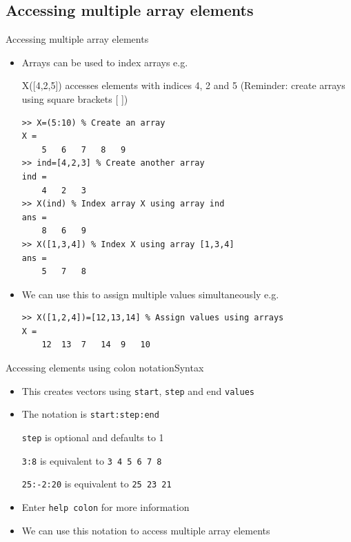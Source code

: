 \documentclass{beamer}
\begin{document}
\subsection{Accessing multiple array elements}
\begin{frame}[fragile]{Accessing multiple array elements}
	\begin{itemize}
		\item Arrays can be used to index arrays e.g.
		
		X([4,2,5]) accesses elements with indices 4, 2 and 5
		(Reminder: create arrays using square brackets [ ])
		
		\begin{lstlisting}[style=Matlab-editor,basicstyle=\scriptsize]
>> X=(5:10) % Create an array
X = 
	5	6	7	8	9
>> ind=[4,2,3] % Create another array
ind = 
	4	2	3
>> X(ind) % Index array X using array ind
ans = 
	8	6	9
>> X([1,3,4]) % Index X using array [1,3,4]
ans =
	5	7	8
		\end{lstlisting}
		\item We can use this to assign multiple values simultaneously e.g.
		
		\begin{lstlisting}[style=Matlab-editor,basicstyle=\scriptsize]
>> X([1,2,4])=[12,13,14] % Assign values using arrays
X = 
	12	13	7	14	9	10
		\end{lstlisting}
	\end{itemize}
\end{frame}

\begin{frame}{Accessing elements using colon notation}{Syntax}
	\begin{itemize}
		\item This creates vectors using \texttt{start}, \texttt{step} and end \texttt{values}
		\item The notation is \texttt{start:step:end}

		\texttt{step} is optional and defaults to 1
		
		\texttt{3:8} is equivalent to \texttt{3 4 5 6 7 8}
		
		\texttt{25:-2:20} is equivalent to \texttt{25 23 21}
		\item Enter \texttt{help colon} for more information
		\item We can use this notation to access multiple array elements
	\end{itemize}
\end{frame}
\end{document}
